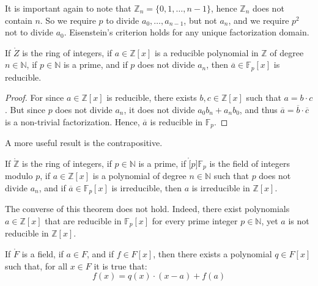 \documentclass{article}                                                        %
\begin{document}
        It is important again to note that $\mathbb{Z}_{n}=\{0,1,\dots,n-1\}$,
        hence $\mathbb{Z}_{n}$ does not contain $n$. So we require $p$ to divide
        $a_{0},\dots,a_{n-1}$, but not $a_{n}$, and we require $p^{2}$ not to
        divide $a_{0}$. Eisenstein's criterion holds for any unique
        factorization domain.
        \begin{theorem}
            If $\ring{Z}$ is the ring of integers, if $a\in\mathbb{Z}[x]$ is a
            reducible polynomial in $\mathbb{Z}$ of degree $n\in\mathbb{N}$, if
            $p\in\mathbb{N}$ is a prime, and if $p$ does not divide $a_{n}$,
            then $\overline{a}\in\mathbb{F}_{p}[x]$ is reducible.
        \end{theorem}
        \begin{proof}
            For since $a\in\mathbb{Z}[x]$ is reducible, there exists
            $b,c\in\mathbb{Z}[x]$ such that $a=b\cdot{c}$. But since
            $p$ does not divide $a_{n}$, it does not divide
            $a_{0}b_{n}+a_{n}b_{0}$, and thus
            $\overline{a}=\overline{b}\cdot\overline{c}$ is a non-trivial
            factorization. Hence, $\overline{a}$ is reducible in
            $\mathbb{F}_{p}$.
        \end{proof}
        A more useful result is the contrapositive.
        \begin{theorem}
            If $\ring{\mathbb{Z}}$ is the ring of integers, if
            $p\in\mathbb{N}$ is a prime, if $\ring[p]{\mathbb{F}_{p}}$ is the
            field of integers modulo $p$, if $a\in\mathbb{Z}[x]$ is a polynomial
            of degree $n\in\mathbb{N}$ such that $p$ does not divide $a_{n}$,
            and if $\overline{a}\in\mathbb{F}_{p}[x]$ is irreducible, then
            $a$ is irreducible in $\mathbb{Z}[x]$.
        \end{theorem}
        The converse of this theorem does not hold. Indeed, there exist
        polynomials $a\in\mathbb{Z}[x]$ that are reducible in
        $\mathbb{F}_{p}[x]$ for every prime integer $p\in\mathbb{N}$, yet $a$
        is not reducible in $\mathbb{Z}[x]$.
        \begin{theorem}
            If $\ring{F}$ is a field, if $a\in{F}$, and if $f\in{F}[x]$, then
            there exists a polynomial $q\in{F}[x]$ such that, for all
            $x\in{F}$ it is true that:
            \begin{equation}
                f(x)=q(x)\cdot(x-a)+f(a)
            \end{equation}
        \end{theorem}
\end{document}
